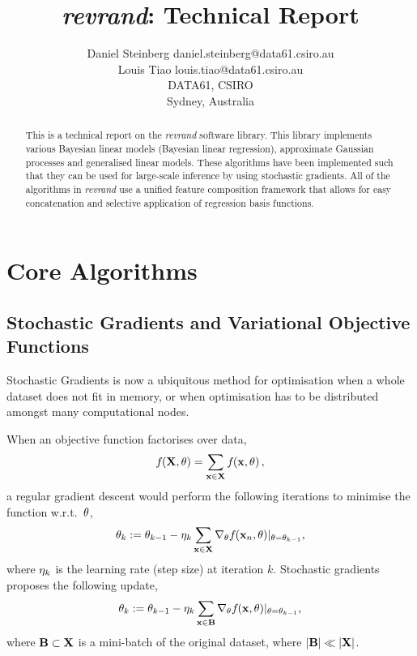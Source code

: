 \documentclass[11pt, oneside]{article}
\title{\emph{revrand}: Technical Report}
\author{\name Daniel Steinberg \email daniel.steinberg@data61.csiro.au \\
        \name Louis Tiao \email louis.tiao@data61.csiro.au \\
        \addr DATA61, CSIRO \\
        Sydney, Australia}
\date{}
\begin{document}
\maketitle

\begin{abstract}
    This is a technical report on the \emph{revrand} software library. This
    library implements various Bayesian linear models (Bayesian linear
    regression), approximate Gaussian processes and generalised linear models.
    These algorithms have been implemented such that they can be used for
    large-scale inference by using stochastic gradients. All of the algorithms
    in \emph{revrand} use a unified feature composition framework that allows
    for easy concatenation and selective application of regression basis
    functions.
\end{abstract}

\tableofcontents

\section{Core Algorithms}

\subsection{Stochastic Gradients and Variational Objective Functions}
\label{sub:stochvar}

Stochastic Gradients is now a ubiquitous method for optimisation when a whole
dataset does not fit in memory, or when optimisation has to be distributed
amongst many computational nodes.

When an objective function factorises over data,
\begin{equation}
    {f}_{}\!\left({{\mathbf{X}, \theta}}\right) = \sum_{\mathbf{x} \in \mathbf{X}} {f}_{}\!\left({{\mathbf{x}, \theta}}\right),
\end{equation}
a regular gradient descent would perform the following iterations to minimise
the function w.r.t.\ $\theta$,
\begin{equation}
    \theta_k := \theta_{k-1} - \eta_k \sum_{\mathbf{x} \in \mathbf{X}}
    \nabla_{\theta} {f}_{}\!\left({{\mathbf{x}_n, \theta}}\right)\!|_{\theta = \theta_{k-1}},
\end{equation}
where $\eta_k$ is the learning rate (step size) at iteration $k$. Stochastic
gradients proposes the following update,
\begin{equation}
    \theta_k := \theta_{k-1} - \eta_k \sum_{\mathbf{x} \in \mathbf{B}}
    \nabla_{\theta} {f}_{}\!\left({{\mathbf{x}, \theta}}\right)\!|_{\theta = \theta_{k-1}},
    \label{eq:sg}
\end{equation}
where $\mathbf{B} \subset \mathbf{X}$ is a mini-batch of the original dataset, where
$|\mathbf{B}| \ll |\mathbf{X}|$.
\end{document}
